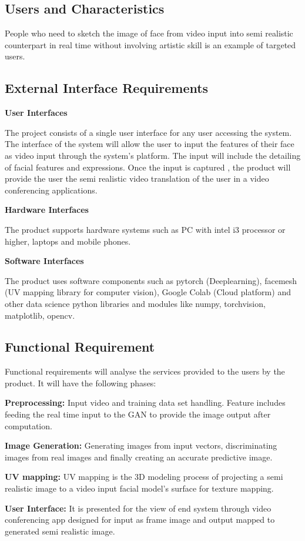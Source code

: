 \documentclass[12pt, a4paper]{report}
\begin{document}
{{\subsection{Users and Characteristics}
\item People who need to sketch the image of face from video input into semi realistic counterpart in real time without involving artistic skill is an example of targeted users.

\subsection{External Interface Requirements}
\item \textbf{User Interfaces}
\item The project consists of a single user interface for any user accessing the system. The
interface of the system will allow the user to input the features of their face as video input through the system's platform. The input will include
the detailing of facial features and expressions. Once the input is captured , the
product will provide the user the semi realistic video translation of the user in a video conferencing applications.

\item \textbf{Hardware Interfaces}
\item The product supports hardware systems such as PC with intel i3 processor or higher, laptops
and mobile phones.

\item \textbf{Software Interfaces}
\item The product uses software components such as pytorch (Deeplearning), facemesh (UV mapping
library for computer vision), Google Colab (Cloud platform) and other data science python libraries and modules like numpy, torchvision, matplotlib, opencv.

\subsection{Functional Requirement}
\item {Functional requirements will analyse the services provided to the users by
the product. It will have the following phases:
\item \textbf{Preprocessing:} Input video and training data set handling. Feature includes feeding
the real time input to the GAN to provide the image output after computation.
\item \textbf{Image Generation:} Generating images from input vectors, discriminating images from
real images and finally creating an accurate predictive image.
\item \textbf{UV mapping:} UV mapping is the 3D modeling process of projecting a semi realistic image to a video input facial model's surface for texture mapping.
\item \textbf{User Interface:} It is presented for the view of end system through video conferencing app  designed for input as frame image and output mapped to generated semi realistic image.


}}}
\end{document}
